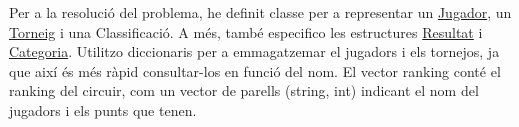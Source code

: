 Per a la resolució del problema, he definit classe per a representar un \mbox{\hyperlink{class_jugador}{Jugador}}, un \mbox{\hyperlink{class_torneig}{Torneig}} i una Classificació. A més, també especifico les estructures \mbox{\hyperlink{struct_resultat}{Resultat}} i \mbox{\hyperlink{struct_categoria}{Categoria}}. Utilitzo diccionaris per a emmagatzemar el jugadors i els tornejos, ja que així és més ràpid consultar-\/los en funció del nom. El vector ranking conté el ranking del circuir, com un vector de parells (string, int) indicant el nom del jugadors i els punts que tenen. 